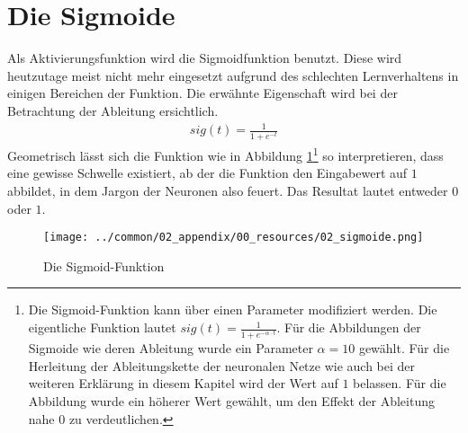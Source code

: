 \section{Die Sigmoide}
Als Aktivierungsfunktion wird die Sigmoidfunktion benutzt. Diese wird heutzutage meist nicht mehr eingesetzt aufgrund
des schlechten Lernverhaltens in einigen Bereichen der Funktion. Die erwähnte Eigenschaft wird bei der Betrachtung
der Ableitung ersichtlich.
\begin{align}
    sig(t) = \frac{1}{1 + e^{-t}}
\end{align}
Geometrisch lässt sich die Funktion wie in Abbildung \ref{fig:02_sigmoide}\footnote{Die Sigmoid-Funktion kann über
einen Parameter modifiziert werden. Die eigentliche Funktion lautet $sig(t) = \frac{1}{1 + e^{-\alpha \cdot t}}$. Für
die Abbildungen der Sigmoide wie deren Ableitung wurde ein Parameter $\alpha = 10$ gewählt. Für die Herleitung
der Ableitungskette der neuronalen Netze wie auch bei der weiteren Erklärung in diesem Kapitel wird der Wert auf $1$
belassen. Für die Abbildung wurde ein höherer Wert gewählt, um den Effekt der Ableitung nahe 0 zu verdeutlichen.} so interpretieren, dass eine gewisse Schwelle existiert, ab der die Funktion
den Eingabewert auf $1$ abbildet, in dem Jargon der Neuronen also \glqq feuert\grqq. Das Resultat lautet
entweder $0$ oder $1$.

\begin{figure}[h!]
    \begin{center}
        \texttt{[image: ../common/02\_appendix/00\_resources/02\_sigmoide.png]}
    \end{center}
    \caption{Die Sigmoid-Funktion}
    \label{fig:02_sigmoide}
\end{figure}

